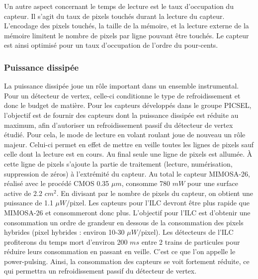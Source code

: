    \medskip
   
   Un autre aspect concernant le temps de lecture est le taux d'occupation du capteur. Il s'agit du taux de pixels touch\'es durant la lecture du capteur. L'encodage des pixels touch\'es, la taille de la m\'emoire, et la lecture externe de la m\'emoire limitent le nombre de pixels par ligne pouvant \^etre touch\'es. Le capteur est ainsi optimis\'e pour un taux d'occupation de l'ordre du pour-cents.
  
   
   \subsubsection{Puissance dissip\'ee}
   
   La puissance dissip\'ee joue un r\^ole important dans un ensemble instrumental. Pour un d\'etecteur de vertex, celle-ci conditionne le type de refroidissement et donc le budget de mati\`ere. Pour les capteurs d\'eveloppés dans le groupe PICSEL, l'objectif est de fournir des capteurs dont la puissance dissip\'ee est r\'eduite au maximum, afin d'autoriser un refroidissement passif du d\'etecteur de vertex \'etudié. Pour cela, le mode de lecture en volant roulant joue de nouveau un r\^ole majeur. Celui-ci permet en effet de mettre en veille toutes les lignes de pixels sauf celle dont la lecture est en cours. Au final seule une ligne de pixels est allum\'ee. \`A cette ligne de pixels s'ajoute la partie de traitement (lecture, num\'erisation, suppression de z\'eros) \`a l'extr\'emit\'e du capteur. Au total le capteur MIMOSA-26, r\'ealis\'e avec le proc\'ed\'e CMOS 0.35 $\mu m$, consomme 780 $mW$ pour une surface active de 2.2 $cm^2$. En divisant par le nombre de pixels du capteur, on obtient une puissance de 1.1 $\mu W/$pixel. Les capteurs pour l'ILC devront \^etre plus rapide que MIMOSA-26 et consommeront donc plus. L'objectif pour l'ILC est d'obtenir une consommation un ordre de grandeur en dessous de la consommation des pixels hybrides (pixel hybrides : environ 10-30 $\mu W/$pixel). Les d\'etecteurs de l'ILC profiterons du temps mort d'environ 200 $ms$ entre 2 trains de particules pour r\'eduire leurs consommation en passant en veille. C'est ce que l'on appelle le power-pulsing. Ainsi, la consommation des capteurs se voit fortement r\'eduite, ce qui permettra un refroidissement passif du d\'etecteur de vertex.
   
   

